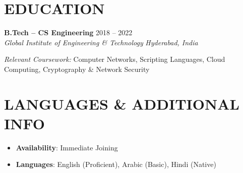 \documentclass[10pt,a4paper]{article}
\newcommand{\jobheading}[4]{
  \vspace{0.2ex}\noindent
  \textbf{#1} \hfill #2 \\
  \textit{#3} \hfill \textit{#4} \vspace{0.2ex}
}
\begin{document}
\vspace{-1.5ex}
\section*{EDUCATION}
\jobheading{B.Tech -- CS Engineering}{2018 -- 2022}{Global Institute of Engineering \& Technology}{Hyderabad, India}

\textit{Relevant Coursework:} Computer Networks, Scripting Languages, Cloud Computing, Cryptography \& Network Security
\section*{LANGUAGES \& ADDITIONAL INFO}
\begin{itemize}[leftmargin=*,itemsep=0pt,parsep=0pt]
    \item \textbf{Availability}: Immediate Joining
    \item \textbf{Languages}: English (Proficient), Arabic (Basic), Hindi (Native)
\end{itemize}
\end{document}
